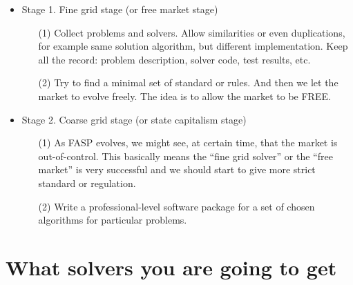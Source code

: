 \documentclass[11pt]{memoir}
\begin{document}
\begin{itemize}

\item Stage 1. Fine grid stage (or free market stage)

\begin{enumerate}
\item[(1)] Collect problems and solvers. Allow similarities or even duplications, for example same solution algorithm, but different implementation. Keep all the record: problem description, solver code, test results, etc.
%
\item[(2)] Try to find a minimal set of standard or rules. And then we let the market to evolve freely. The idea is to allow the market to be FREE.
\end{enumerate}

\item Stage 2. Coarse grid stage (or state capitalism stage)

\begin{enumerate}
\item[(1)] As FASP evolves, we might see, at certain time, that the market is out-of-control. This basically means the ``fine grid solver'' or the ``free market'' is very successful and we should start to give more strict standard or regulation.
%
\item[(2)] Write a professional-level software package for a set of chosen algorithms for particular problems.
\end{enumerate}
\end{itemize}

\section{What solvers you are going to get}\label{sec:idea}
\end{document}

